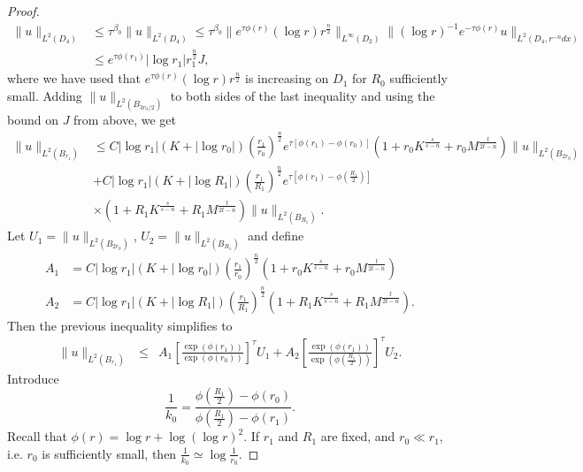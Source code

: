 \documentclass[11pt]{amsart}
\theoremstyle{plain}
\numberwithin{equation}{section}
\begin{document}
\begin{proof}
\begin{align*}
\| u\|_{L^2 (D_4)}
&\le \tau^{\beta_0}\| u\|_{L^2 (D_4)}
\le \tau^{\beta_0} \|e^{\tau\phi(r)}(\log r) r^{\frac{n}{2}}\|_{L^{\infty}{\left( {D_2} \right) }} \| (\log r)^{-1} e^{-\tau\phi(r)} u\|_{L^2 (D_4, r^{-n}dx)}  \\
&\le e^{\tau \phi(r_1)} |\log r_1| r_1^{\frac{n}{2}} J,
\end{align*}
where we have used that $e^{\tau\phi(r)}(\log r) r^{\frac{n}{2}}$ is increasing on $D_1$ for $R_0$ sufficiently small.
Adding $\|u\|_{L^2 {\left( {B_{3r_0/2}} \right) }}$ to both sides of the last inequality and using the bound on $J$ from above, we get
\begin{align*}
\| u\|_{L^2 (B_{r_1})}
&\le C |\log r_1|  {\left( {K+|\log r_0|} \right) } {\left( {\frac{r_1}{r_0}} \right) }^{\frac{n}{2}}e^{\tau {\left[{\phi(r_1)- \phi(r_0)}\right]}}{\left( {1+ r_0K^{\frac{s}{s-n}}+r_0M^{\frac{t}{2t-n}}} \right) }\|u\|_{L^2(B_{2r_0})} \\
&+ C |\log r_1| {\left( {K+|\log R_1|} \right) }
{\left( {\frac{r_1}{R_1}} \right) }^{\frac{n}{2}}e^{\tau{\left[{\phi(r_1) -
\phi{\left( {\frac{R_1}{2}} \right) }}\right]}}\nonumber \\
&\times{\left( {1+R_1K^{\frac{s}{s-n}}+R_1M^{\frac{t}{2t-n}}} \right) }
\|u\|_{L^2(B_{R_1})}.
\end{align*}
Let $U_1 =\|u\|_{L^2(B_{2r_0})}$, $U_2=\|u\|_{L^2(B_{R_1})}$ and define
\begin{align*}
A_1 &= C |\log r_1|  {\left( {K+|\log r_0|} \right) } {\left( {\frac{r_1}{r_0}} \right) }^{\frac{n}{2}} {\left( {1+ r_0K^{\frac{s}{s-n}}+r_0M^{\frac{t}{2t-n}}} \right) } \\
A_2 &= C |\log r_1| {\left( {K+|\log R_1|} \right) } {\left( {\frac{r_1}{R_1}} \right) }^{\frac{n}{2}} {\left( {1+R_1K^{\frac{s}{s-n}}+R_1M^{\frac{t}{2t-n}}} \right) }.
\end{align*}
Then the previous inequality simplifies to
\begin{eqnarray}
\| u\|_{L^2 (B_{r_1})}  &\leq& A_1 {\left[{\frac{\exp {\left( {\phi(r_1)} \right) }}{\exp{\left( { \phi(r_0)} \right) }}}\right]}^\tau U_1 + A_2 {\left[{\frac{\exp{\left( { \phi(r_1)} \right) }}{\exp{\left( { \phi{\left( {\frac{R_1}{2}} \right) }} \right) }}}\right]}^\tau U_2.
\label{D4est}
\end{eqnarray}
Introduce
$$\frac{1}{k_0}=\frac{\phi(\frac{R_1}{2})-\phi(r_0)}{\phi(\frac{R_1}{2})-\phi(r_1)}.$$
Recall that $\phi(r)=\log r+\log (\log r)^2$.
If $r_1$ and $R_1$ are fixed, and $r_0\ll r_1$, i.e. $r_0$ is sufficiently small, then $\frac{1}{k_0}\simeq \log \frac{1}{r_0}$.

\end{proof}
\end{document}

